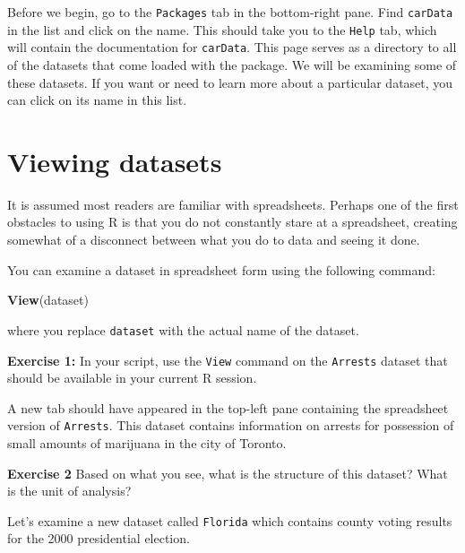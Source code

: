 \documentclass[
]{book}
\newenvironment{Shaded}{\begin{snugshade}}{\end{snugshade}}
\newcommand{\KeywordTok}[1]{\textcolor[rgb]{0.13,0.29,0.53}{\textbf{#1}}}
\newcommand{\NormalTok}[1]{#1}
\newenvironment{learncheck}%
{%
  \par\vspace{\baselineskip}\noindent 
  \color{Exercise}\begin{itshape}%
  \par\vspace{\baselineskip}\noindent\ignorespaces 
}%
{%
  \end{itshape}\ignorespacesafterend 
}
\begin{document}
Before we begin, go to the \texttt{Packages} tab in the bottom-right pane. Find \texttt{carData} in the list and click on the name. This should take you to the \texttt{Help} tab, which will contain the documentation for \texttt{carData}. This page serves as a directory to all of the datasets that come loaded with the package. We will be examining some of these datasets. If you want or need to learn more about a particular dataset, you can click on its name in this list.

\hypertarget{viewing-datasets}{%
\section{Viewing datasets}\label{viewing-datasets}}

It is assumed most readers are familiar with spreadsheets. Perhaps one of the first obstacles to using R is that you do not constantly stare at a spreadsheet, creating somewhat of a disconnect between what you do to data and seeing it done.

You can examine a dataset in spreadsheet form using the following command:

\begin{Shaded}
\begin{Highlighting}[]
\KeywordTok{View}\NormalTok{(dataset)}
\end{Highlighting}
\end{Shaded}

where you replace \texttt{dataset} with the actual name of the dataset.

\begin{learncheck}
\textbf{Exercise 1:} In your script, use the \texttt{View} command on
the \texttt{Arrests} dataset that should be available in your current R
session.
\end{learncheck}

A new tab should have appeared in the top-left pane containing the spreadsheet version of \texttt{Arrests}. This dataset contains information on arrests for possession of small amounts of marijuana in the city of Toronto.

\begin{learncheck}
\textbf{Exercise 2} Based on what you see, what is the structure of this
dataset? What is the unit of analysis?
\end{learncheck}

Let's examine a new dataset called \texttt{Florida} which contains county voting results for the 2000 presidential election.
\end{document}
